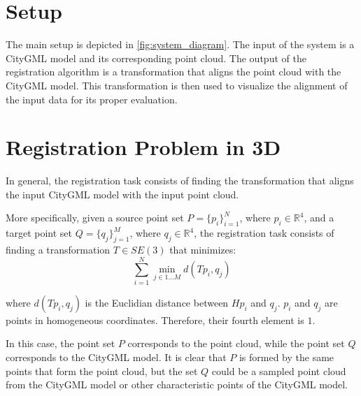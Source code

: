     \section{Setup}
        The main setup is depicted in \autoref{fig:system_diagram}.
        The input of the system is a CityGML model and its corresponding point cloud. 
        The output of the registration algorithm is a transformation that aligns the point cloud with the CityGML model.
        This transformation is then used to visualize the alignment of the input data for its proper evaluation.

    \section{Registration Problem in 3D}
    \label{section:Registration Problem in 3D}
        In general, the registration task consists of finding the transformation that aligns the input CityGML model with the input point cloud.

        More specifically, given a source point set $P = \{p_i\}_{i=1}^N$, where $p_i \in \mathbb {R}^{4}$,
        and a target point set $Q = \{q_j\}_{j=1}^M$, where $q_j \in \mathbb {R}^{4}$,
        the registration task consists of finding a transformation $T \in SE(3)$ that minimizes:
        \begin{equation}
            \label{eq:lossfunction}
            \sum_{i = 1}^{N} \min_{j \in {1...M}} d( T p_i , q_j )    
        \end{equation}
          
        where $d(T p_i, q_j)$ is the Euclidian distance between $H p_i$ and $q_j$.
        $p_i$ and $q_j$ are points in homogeneous coordinates. Therefore, their fourth element is $1$.

        In this case, the point set $P$ corresponds to the point cloud, while the point set $Q$ corresponds to the CityGML model.
        It is clear that $P$ is formed by the same points that form the point cloud, 
        but the set $Q$ could be a sampled point cloud from the CityGML model
        or other characteristic points of the CityGML model.
        
